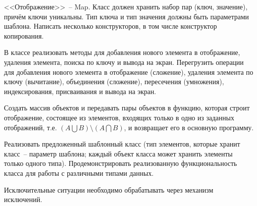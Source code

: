 
<<Отображение>>~-- Map. Класс должен хранить набор пар (ключ, значение), причём ключи
уникальны. Тип ключа и тип значения должны быть параметрами шаблона. Написать
несколько конструкторов, в том числе конструктор копирования.

В классе реализовать
методы для добавления нового элемента в отображение, удаления элемента, поиска по
ключу и вывода на экран. Перегрузить операции для добавления нового элемента в
отображение (сложение), удаления элемента по ключу (вычитание), объединения
(сложение), пересечения (умножения), индексирования, присваивания и вывода на экран.

Создать массив объектов и передавать пары объектов в функцию, которая строит
отображение, состоящее из элементов, входящих только в одно из заданных отображений,
т.е. $(A\bigcup B) \setminus (A\bigcap B)$, и возвращает его в основную программу.

Реализовать предложенный шаблонный класс (тип элементов, которые
хранит класс~-- параметр шаблона; каждый объект класса может хранить
элементы только одного типа). Продемонстрировать реализованную
функциональность класса для работы с различными типами данных.

Исключительные ситуации необходимо обрабатывать через механизм исключений.
